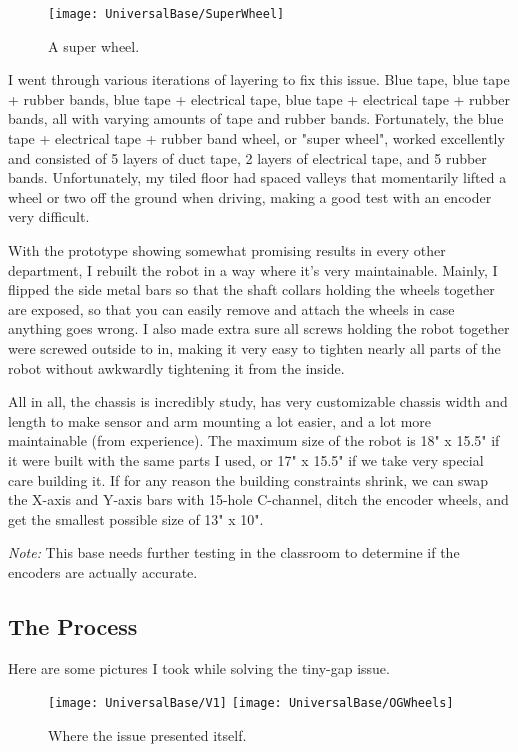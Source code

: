 \begin{figure}[h]
    \centering
    \texttt{[image: UniversalBase/SuperWheel]}
    \caption{
        A super wheel.
    }
\end{figure}

I went through various iterations of layering to fix this issue. Blue tape, blue tape + rubber bands, blue tape + electrical tape, blue tape + electrical tape + rubber bands, all with varying amounts of tape and rubber bands. Fortunately, the blue tape + electrical tape + rubber band wheel, or "super wheel", worked excellently and consisted of 5 layers of duct tape, 2 layers of electrical tape, and 5 rubber bands. Unfortunately, my tiled floor had spaced valleys that momentarily lifted a wheel or two off the ground when driving, making a good test with an encoder very difficult.

With the prototype showing somewhat promising results in every other department, I rebuilt the robot in a way where it's very maintainable. Mainly, I flipped the side metal bars so that the shaft collars holding the wheels together are exposed, so that you can easily remove and attach the wheels in case anything goes wrong. I also made extra sure all screws holding the robot together were screwed outside to in, making it very easy to tighten nearly all parts of the robot without awkwardly tightening it from the inside.

All in all, the chassis is incredibly study, has very customizable chassis width and length to make sensor and arm mounting a lot easier, and a lot more maintainable (from experience). The maximum size of the robot is 18" x 15.5" if it were built with the same parts I used, or 17" x 15.5" if we take very special care building it. If for any reason the building constraints shrink, we can swap the X-axis and Y-axis bars with 15-hole C-channel, ditch the encoder wheels, and get the smallest possible size of 13" x 10".

\textit{Note:} This base needs further testing in the classroom to determine if the encoders are actually accurate.

\subsection{The Process}
Here are some pictures I took while solving the tiny-gap issue.

\begin{figure}[h]
    \centering
    \texttt{[image: UniversalBase/V1]}
    \texttt{[image: UniversalBase/OGWheels]}
    \caption{
        Where the issue presented itself.
    }
\end{figure}

